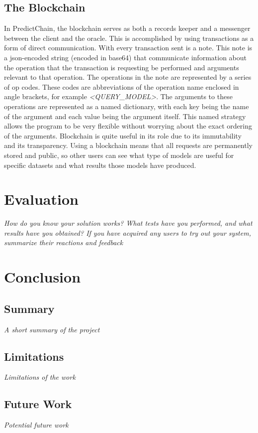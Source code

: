 \documentclass{article}
\begin{document}
\subsection{The Blockchain}

In PredictChain, the blockchain serves as both a records keeper and a messenger between the client and the oracle.
This is accomplished by using transactions as a form of direct communication.  With every transaction sent is a note.
This note is a json-encoded string (encoded in base64) that communicate information about the operation that the transaction
is requesting be performed and arguments relevant to that operation.  The operations in the note are represented by a series
of op codes.  These codes are abbreviations of the operation name enclosed in angle brackets, for example \textit{<QUERY\_MODEL>}.
The arguments to these operations are represented as a named dictionary, with each key being the name of the argument and each
value being the argument itself.  This named strategy allows the program to be very flexible without worrying about the exact
ordering of the arguments.  Blockchain is quite useful in its role due to its immutability and its transparency.  Using
a blockchain means that all requests are permanently stored and public, so other users can see what type of models are useful
for specific datasets and what results those models have produced.

\section{Evaluation}

\emph{How do you know your solution works? What tests have you performed, and what results have you obtained?
If you have acquired any users to try out your system, summarize their reactions and feedback}

\section{Conclusion}

\subsection{Summary}
\emph{A short summary of the project}

\subsection{Limitations}
\emph{Limitations of the work}

\subsection{Future Work}
\emph{Potential future work}

\cite{test}


\end{document}
